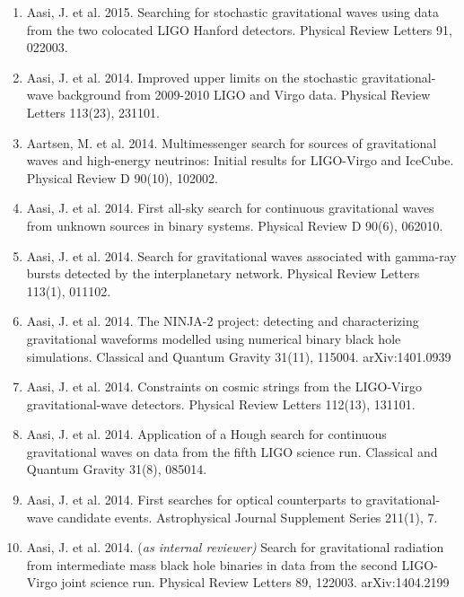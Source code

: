 \documentclass[margin,line]{res}
\begin{document}
\begin{resume}
\begin{enumerate}
\item Aasi, J. et al. 2015. Searching for stochastic gravitational waves using data from the two colocated LIGO Hanford detectors. Physical Review Letters 91, 022003. 

\item Aasi, J. et al. 2014. Improved upper limits on the stochastic gravitational-wave background from 2009-2010 LIGO and Virgo data. Physical Review Letters 113(23),  231101. 

\item Aartsen, M. et al. 2014. Multimessenger search for sources of gravitational waves and high-energy neutrinos: Initial results for LIGO-Virgo and IceCube. Physical Review D 90(10), 102002.

\item Aasi, J. et al. 2014. First all-sky search for continuous gravitational waves from unknown sources in binary systems. Physical Review D  90(6), 062010. 

\item Aasi, J. et al. 2014. Search for gravitational waves associated with gamma-ray bursts detected by the interplanetary network. Physical Review Letters 113(1), 011102. 

\item Aasi, J. et al. 2014. The NINJA-2 project: detecting and characterizing gravitational waveforms modelled using numerical binary black hole simulations. Classical and Quantum Gravity 31(11),  115004.  arXiv:1401.0939

\item Aasi, J. et al. 2014. Constraints on cosmic strings from the LIGO-Virgo gravitational-wave detectors. Physical Review Letters 112(13), 131101. 

\item Aasi, J. et al. 2014. Application of a Hough search for continuous gravitational waves on data from the fifth LIGO science run. Classical and Quantum Gravity 31(8), 085014. 

\item Aasi, J. et al. 2014. First searches for optical counterparts to gravitational-wave candidate events. Astrophysical Journal Supplement Series 211(1), 7. 

\item  Aasi, J. et al.  2014.  {(\it as internal reviewer)}  Search for gravitational radiation from intermediate mass black hole binaries in data from the second LIGO-Virgo joint science run.  Physical Review Letters 89, 122003.  arXiv:1404.2199


\end{enumerate}
\end{resume}
\end{document}

